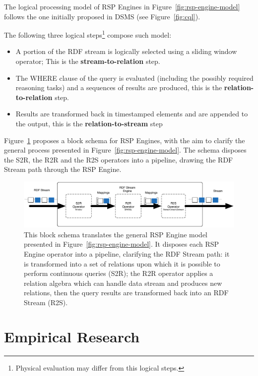 The logical processing model of RSP Engines in Figure~\ref{fig:rsp-engine-model} follows the one initially proposed in DSMS (see Figure~\ref{fig:cql}).

The following three logical steps\footnote{Physical evaluation may differ from this logical steps.} compose such model: 
\begin{itemize}
\item[1.] A portion of the RDF stream is logically selected using a sliding window operator; This is the \textbf{stream-to-relation} step. 
\item[2.] The WHERE clause of the query is evaluated (including the possibly required reasoning tasks) and a sequences of results are produced, this is the \textbf{relation-to-relation} step.
\item[3.] Results are transformed back in timestamped elements and are appended to the output, this is the \textbf{relation-to-stream} step 
\end{itemize}

Figure~\ref{fig:rsp-engine-schema} proposes a block schema for RSP Engines, with the aim to clarify the general process presented in Figure~\ref{fig:rsp-engine-model}. The schema disposes the S2R, the R2R and the R2S operators into a pipeline, drawing the RDF Stream path through the RSP Engine.


\begin{figure}[tbh]
  \centering
	\includegraphics[width=\linewidth]{images/rsp-block-schema}
	\caption[RSP Engine Block Schema]{This block schema translates the general RSP Engine model presented in Figure~\ref{fig:rsp-engine-model}. It disposes each RSP Engine operator into a pipeline, clarifying the RDF Stream path: it is transformed into a set of relations upon which it is possible to perform continuous queries (S2R); the R2R operator applies a relation algebra which can handle data stream and produces new relations, then the query results are transformed back into an RDF Stream (R2S).}
  	\label{fig:rsp-engine-schema}
\end{figure}

\pagebreak

\section{Empirical Research}\label{sec:empirical-research}

